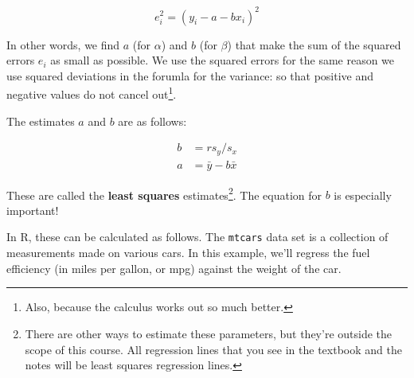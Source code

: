 \documentclass[
  letterpaper,
  DIV=11,
  numbers=noendperiod]{scrreprt}
\newenvironment{Shaded}{\begin{snugshade}}{\end{snugshade}}
\newcommand{\CommentTok}[1]{\textcolor[rgb]{0.37,0.37,0.37}{#1}}
\newcommand{\FunctionTok}[1]{\textcolor[rgb]{0.28,0.35,0.67}{#1}}
\newcommand{\NormalTok}[1]{\textcolor[rgb]{0.00,0.23,0.31}{#1}}
\newcommand{\OtherTok}[1]{\textcolor[rgb]{0.00,0.23,0.31}{#1}}
\newcommand{\SpecialCharTok}[1]{\textcolor[rgb]{0.37,0.37,0.37}{#1}}
\begin{document}
\[e_i^2 = (y_i - a - b x_i)^2\]

In other words, we find \(a\) (for \(\alpha\)) and \(b\) (for \(\beta\))
that make the sum of the squared errors \(e_i\) as small as possible. We
use the squared errors for the same reason we use squared deviations in
the forumla for the variance: so that positive and negative values do
not cancel out\footnote{Also, because the calculus works out so much
  better.}.

The estimates \(a\) and \(b\) are as follows:

\begin{align*}
b &= rs_y/s_x\\
a &= \bar y - b\bar x
\end{align*}

These are called the \textbf{least squares} estimates\footnote{There are
  other ways to estimate these parameters, but they're outside the scope
  of this course. All regression lines that you see in the textbook and
  the notes will be least squares regression lines.}. The equation for
\(b\) is especially important!

In R, these can be calculated as follows. The \texttt{mtcars} data set
is a collection of measurements made on various cars. In this example,
we'll regress the fuel efficiency (in miles per gallon, or mpg) against
the weight of the car.

\begin{Shaded}
\end{Shaded}
\end{document}

